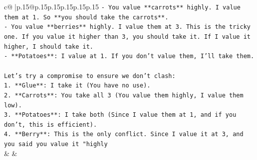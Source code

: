 \documentclass{article}
\begin{document}
{\begin{supertabular}{c@{$\;$}|p{.15\linewidth}@{}p{.15\linewidth}p{.15\linewidth}p{.15\linewidth}p{.15\linewidth}p{.15\linewidth}}
{{{\texttt{{-} You value **carrots** highly. I value them at 1. So **you should take the carrots**.} \\
\texttt{{-} You value **berries** highly. I value them at 3. This is the tricky one. If you value it higher than 3, you should take it. If I value it higher, I should take it.} \\
\texttt{{-} **Potatoes**: I value at 1. If you don't value them, I'll take them.} \\
\\ 
\texttt{Let's try a compromise to ensure we don't clash:} \\
\texttt{1. **Glue**: I take it (You have no use).} \\
\texttt{2. **Carrots**: You take all 3 (You value them highly, I value them low).} \\
\texttt{3. **Potatoes**: I take both (Since I value them at 1, and if you don't, this is efficient).} \\
\texttt{4. **Berry**: This is the only conflict. Since I value it at 3, and you said you value it "highly} \\
            }
        }
    }
    & & \\ \\


\end{supertabular}}
\end{document}
